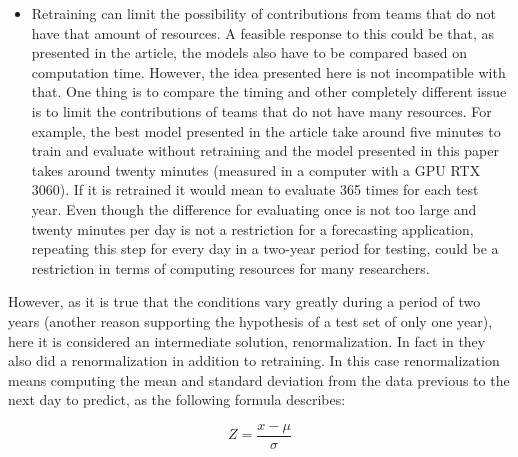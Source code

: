\documentclass[journal]{IEEEtran}
\begin{document}
\begin{itemize}
    \item Retraining can limit the possibility of contributions from teams that do not have that amount of resources. A feasible response to this could be that, as presented in the article, the models also have to be compared based on computation time. However, the idea presented here is not incompatible with that. One thing is to compare the timing and other completely different issue is to limit the contributions of teams that do not have many resources. For example, the best model presented in the article take around five minutes to train and evaluate without retraining and the model presented in this paper takes around twenty minutes (measured in a computer with a GPU RTX 3060). If it is retrained it would mean to evaluate 365 times for each test year. Even though the difference for evaluating once is not too large and twenty minutes per day is not a restriction for a forecasting application, repeating this step for every day in a two-year period for testing, could be a restriction in terms of computing resources for many researchers.
\end{itemize}

However, as it is true that the conditions vary greatly during a period of two years (another reason supporting the hypothesis of a test set of only one year), here it is considered an intermediate solution, renormalization. In fact in \cite{lagoForecastingDayaheadElectricity2021} they also did a renormalization in addition to retraining. In this case renormalization means computing the mean and standard deviation from the data previous to the next day to predict, as the following formula describes:

\begin{equation}
    \label{eq: normalization}
    Z = \frac{x - \mu}{\sigma}
\end{equation}
\end{document}
